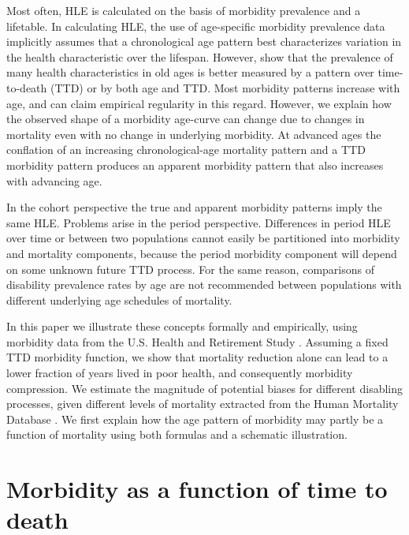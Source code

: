 \documentclass[11pt,oneside,a4paper]{article} %
\begin{document}
Most often, HLE is calculated on the basis of morbidity prevalence and a lifetable. In calculating HLE, the use of age-specific morbidity prevalence data implicitly
assumes that a chronological age pattern best characterizes variation in the
health characteristic over the lifespan.
However, \citet{riffe2015ttd} show that the prevalence of many health characteristics in old ages is better measured by a pattern over time-to-death (TTD) or by both age and TTD. Most morbidity
patterns increase with age, and can claim empirical regularity in this regard.
However, we explain how the observed shape of a morbidity age-curve can change
due to changes in mortality even with no change in underlying morbidity. At advanced ages the conflation of an increasing chronological-age
mortality pattern and a TTD morbidity pattern produces an apparent morbidity pattern that also increases with advancing age. 

In the
cohort perspective the true and apparent morbidity patterns imply the same HLE.
Problems arise in the period perspective. Differences in period HLE over
time or between two populations cannot easily be partitioned into morbidity and
mortality components, because the period morbidity component will depend on some unknown future TTD process. For the same reason, comparisons of disability prevalence rates by age are not recommended between populations with different underlying age schedules of mortality.

In this paper we illustrate these concepts formally and empirically, using morbidity data from the U.S. Health and Retirement Study \citep{RAND, HRS}. Assuming a fixed TTD morbidity function, we show that mortality reduction alone can lead to a lower fraction of years lived in poor health, and consequently morbidity compression. We estimate the magnitude of potential biases for different disabling processes, given different levels of mortality extracted from the Human Mortality Database \citep{HMD2015}. We first explain how the age pattern of morbidity may partly be a function of mortality using both formulas and a schematic illustration.


\section{Morbidity as a function of time to death}
 \label{sec:morb}
 
\end{document}
